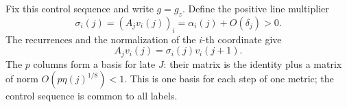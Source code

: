 Fix this control sequence and write \(g=g_z\).  Define the positive line
multiplier
\[
 \sigma_i(j)=(A_jv_i(j))_i
             =\alpha_i(j)+O(\delta_j)>0.
\]
The recurrences and the normalization of the \(i\)-th coordinate give
\begin{equation}
 A_jv_i(j)=\sigma_i(j)v_i(j+1).
 \label{n:eq-exact-lines}
\end{equation}
The \(p\) columns form a basis for late \(J\): their matrix is the identity
plus a matrix of norm \(O(p\eta(j)^{1/8})<1\).  This is one basis for each
step of one metric; the control sequence is common to all labels.
